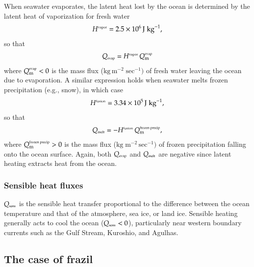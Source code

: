 When seawater evaporates, the latent heat lost by the ocean is
determined by the latent heat of vaporization for fresh water
  \begin{equation}
  H^{\mbox{\tiny vapor}} = 2.5 \times 10^{6} \, \mbox{J} \; \mbox{kg}^{-1},
\label{eq:latent-heat-vapor}
\end{equation}
so that 
\begin{equation}
  Q_{\mbox{\tiny evap}}  =  H^{\mbox{\tiny vapor}} \,  Q_{\mbox{\scriptsize m}}^{\mbox{\tiny evap}}
\end{equation}
where $Q_{\mbox{\scriptsize m}}^{\mbox{\tiny evap}} < 0$ is the mass flux ($\mbox{kg} \,
\mbox{m}^{-2} \; \mbox{sec}^{-1})$ of fresh water leaving the ocean
due to evaporation. A similar expression holds when seawater melts
frozen precipitation (e.g., snow), in which case
\begin{equation}
  H^{\mbox{\tiny fusion}} = 3.34 \times 10^{5} \, \mbox{J} \; \mbox{kg}^{-1},
\label{eq:latent-heat-fusion}
\end{equation}
 so that 
\begin{equation}
  Q_{\mbox{\tiny melt}}  =  -H^{\mbox{\tiny fusion}} \,  Q_{\mbox{\scriptsize m}}^{\mbox{\tiny frozen precip}},
\end{equation}
where $Q_{\mbox{\scriptsize m}}^{\mbox{\tiny frozen precip}} > 0$ is the mass flux
($\mbox{kg} \; \mbox{m}^{-2} \, \mbox{sec}^{-1})$ of frozen
precipitation falling onto the ocean surface. Again, both
$Q_{\mbox{\tiny evap}}$ and $Q_{\mbox{\tiny melt}}$ are negative since
latent heating extracts heat from the ocean.


\subsubsection{Sensible heat fluxes}

$Q_{\mbox{\tiny sens}}$ is the sensible heat transfer proportional to
the difference between the ocean temperature and that of the
atmosphere, sea ice, or land ice. Sensible heating generally acts to
cool the ocean ($Q_{\mbox{\tiny sens}} < 0$), particularly near
western boundary currents such as the Gulf Stream, Kuroshio, and
Agulhas.


\subsection{The case of frazil}
\label{subsection:frazil-and-kpp}

